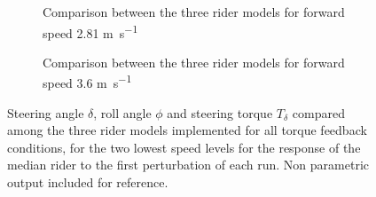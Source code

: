    \begin{figure}
        \centering
        \begin{subfigure}[b]{\textwidth}
            \centering
            \caption{Comparison between the three rider models for forward speed 2.81 \si{\meter\per\second}}
            \label{fig:results_compare1}
        \end{subfigure}
        \begin{subfigure}[b]{\textwidth}
            \centering
            \caption{Comparison between the three rider models for forward speed 3.6 \si{\meter\per\second}}            
            \label{fig:results_compare2}
        \end{subfigure}
        \caption{Steering angle \ensuremath{\delta}, roll angle \ensuremath{\phi} and steering torque \ensuremath{T_\delta} compared among the three rider models implemented for all torque feedback conditions, for the two lowest speed levels for the response of the median rider to the first perturbation of each run. Non parametric output included for reference.}
        \label{fig:results_compare12}
     \end{figure}



